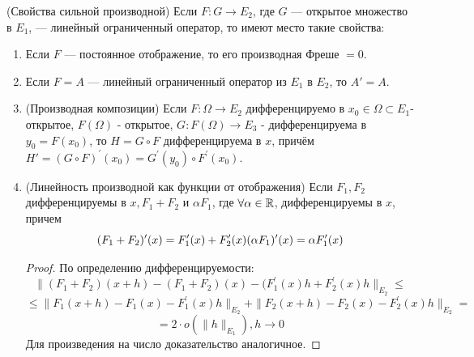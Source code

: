 \begin{theorem} (Свойства сильной производной)
	Если $F \colon G \to E_2$, где $G$ --- открытое множество в $E_1$, --- линейный ограниченный оператор, то имеют место такие свойства:
	\begin{enumerate}
	    \item Если $F$ --- постоянное отображение, то его производная Фреше $=0$.

	    \item Если $F = A$ --- линейный ограниченный оператор из $E_1$ в $E_2$, то $A'=A$.
	    
	    \item (Производная композиции) Если $F:\Omega\to E_2$ дифференцируемо в $x_0 \in \Omega\subset E_1$- открытое, $F(\Omega)$ - открытое, $G \colon F(\Omega) \to E_3$ - дифференцируема в $y_0=F(x_0)$, то $H=G \circ F$ дифференцируема в $x$, причём $H'=(G \circ F)^\prime (x_0) = G^\prime(y_0) \circ F^\prime (x_0)$.

	    \item (Линейность производной как функции от отображения) Если $F_1, F_2$ дифференцируемы в $x, F_1+F_2$ и $\alpha F_1$, где $\forall \alpha \in \mathbb{R}$, дифференцируемы в $x$, причем 
	    \[
	        (F_1+F_2)^\prime (x) = F^\prime_1 (x)+F^\prime_2 (x)\\
	        (\alpha F_1)^\prime (x) = \alpha F^\prime_1(x)
	    \]
	    \begin{proof}
	        По определению дифференцируемости$\colon$ 
	        \[
	            \|(F_1+F_2)(x+h) - (F_1+F_2)(x) - (F_1^\prime(x) h + F^\prime_2(x) h \|_{E_2} \leq
	        \]
	        \[
	            \leq \|F_1 (x+h) - F_1 (x) - F^\prime_1(x)h\|_{E_2} + \|F_2(x+h) - F_2(x) - F^\prime_2(x)h\|_{E_2} =
	        \]
	        \[
	            = 2\cdot o(\|h\|_{E_1}), h \to 0
	        \]
	        Для произведения на число доказательство аналогичное.
	    \end{proof}
	\end{enumerate}
\end{theorem}

